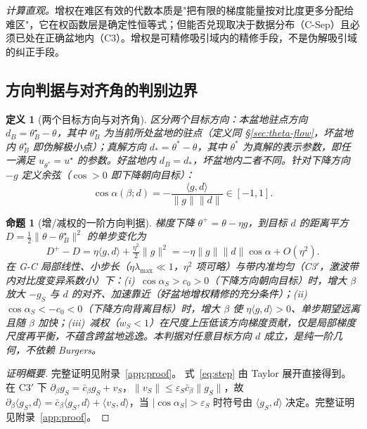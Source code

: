 \documentclass[fontset=windows,11pt]{ctexart}
\newtheorem{definition}{定义}[section]
\newtheorem{proposition}{命题}[section]
\numberwithin{equation}{section}
\begin{document}
\noindent\emph{计算直观。}增权在难区有效的代数本质是"把有限的梯度能量按对比度更多分配给难区"，它在权函数层是确定性恒等式；但能否兑现取决于数据分布（C-Sep）且必须已处在正确盆地内（C3）。增权是可精修吸引域内的精修手段，不是伪解吸引域的纠正手段。

\subsection{方向判据与对齐角的判别边界}\label{sec:theta-align}

\begin{definition}[两个目标方向与对齐角]\label{def:align}
区分两个目标方向：\emph{本盆地驻点方向} $d_B=\theta_B^\star-\theta$，其中 $\theta_B^\star$ 为当前所处盆地的驻点（定义同 \S\ref{sec:theta-flow}，坏盆地内 $\theta_B^\star$ 即伪解极小点）；\emph{真解方向} $d_*=\theta^*-\theta$，其中 $\theta^*$ 为真解的表示参数，即任一满足 $u_{\theta^*}=u^\star$ 的参数。好盆地内 $d_B=d_*$，坏盆地内二者不同。针对下降方向 $-g$ 定义余弦（$\cos>0$ 即下降朝向目标）：
\begin{equation}\label{eq:cos}
\cos\alpha(\beta;d)=-\frac{\langle g,d\rangle}{\|g\|\|d\|}\in[-1,1].
\end{equation}
\end{definition}

\begin{proposition}[增/减权的一阶方向判据]\label{prop:align}
梯度下降 $\theta^+=\theta-\eta g$，到目标 $d$ 的距离平方 $D=\tfrac12\|\theta-\theta_B^\star\|^2$ 的单步变化为
\begin{equation}\label{eq:step}
D^+-D=\eta\langle g,d\rangle+\tfrac{\eta^2}{2}\|g\|^2
=-\eta\|g\|\|d\|\cos\alpha+O(\eta^2).
\end{equation}
在 G-C 局部线性、小步长（$\eta\lambda_{\max}\ll1$，$\eta^2$ 项可略）与带内准均匀（C3$'$，激波带内对比度变异系数小）下：(i)~$\cos\alpha_S>c_0>0$（下降方向朝向目标）时，增大 $\beta$ 放大 $-g_S$ 与 $d$ 的对齐、\emph{加速靠近}（好盆地增权精修的充分条件）；(ii)~$\cos\alpha_S<-c_0<0$（下降方向背离目标）时，增大 $\beta$ 使 $\eta\langle g,d\rangle>0$、\emph{单步期望远离且随 $\beta$ 加快}；(iii)~减权（$w_S<1$）在尺度上压低该方向梯度贡献，仅是局部梯度尺度再平衡，不蕴含跨盆地逃逸。本判据对\emph{任意}目标方向 $d$ 成立，是纯一阶几何，不依赖 Burgers。
\end{proposition}
\begin{proof}[证明概要]完整证明见附录~\ref{app:proof}。
式~\eqref{eq:step} 由 Taylor 展开直接得到。在 C3$'$ 下 $\partial_\beta g_S=\bar c_\beta g_S+v_S$，$\|v_S\|\le\varepsilon_S\bar c_\beta\|g_S\|$，故 $\partial_\beta\langle g_S,d\rangle=\bar c_\beta\langle g_S,d\rangle+\langle v_S,d\rangle$，当 $|\cos\alpha_S|>\varepsilon_S$ 时符号由 $\langle g_S,d\rangle$ 决定。完整证明见附录~\ref{app:proof}。
\end{proof}
\end{document}
